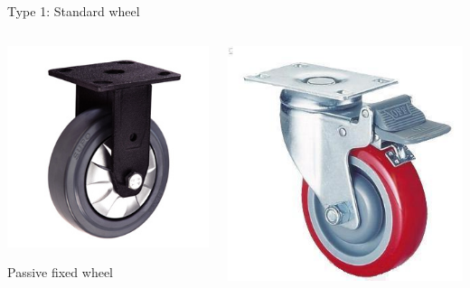 \documentclass[compress]{beamer}
\begin{document}
\begin{frame}{Type 1: Standard wheel}
{    \begin{columns}
        \begin{column}{0.5\linewidth}
            \begin{center}
                \includegraphics[width=0.8\linewidth]{wheel_ex1}

                Passive fixed wheel
            \end{center}
        \end{column}
        \begin{column}{0.5\linewidth}

            \begin{center}
                \includegraphics[width=0.8\linewidth]{wheel_ex2}


\end{center}
\end{column}
\end{columns}}
\end{frame}
\end{document}

